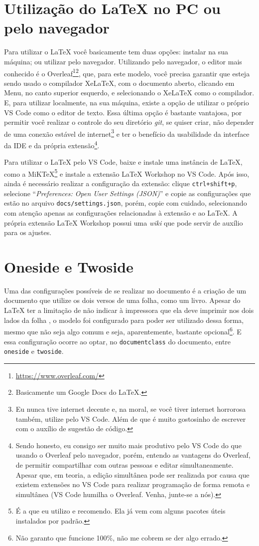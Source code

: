 \section{Utilização do \LaTeX{} no PC ou pelo navegador}
Para utilizar o \LaTeX{} você basicamente tem duas opções: instalar na sua máquina; ou utilizar pelo navegador. Utilizando pelo navegador, o editor mais conhecido é o Overleaf\footnote{\url{https://www.overleaf.com/}}\footnote{Basicamente um Google Docs do \LaTeX.}, que, para este modelo, você precisa garantir que esteja sendo usado o compilador XeLaTeX, com o documento aberto, clicando em Menu, no canto superior esquerdo, e selecionando o XeLaTeX como o compilador. E, para utilizar localmente, na sua máquina, existe a opção de utilizar o próprio VS Code como o editor de texto. Essa última opção é bastante vantajosa, por permitir você realizar o controle do seu diretório \textit{git}, se quiser criar, não depender de uma conexão estável de internet\footnote{Eu nunca tive internet decente e, na moral, se você tiver internet horrorosa também, utilize pelo VS Code. Além de que é muito gostosinho de escrever com o auxílio de sugestão de código.} e ter o benefício da usabilidade da interface da IDE e da própria extensão\footnote{Sendo honesto, eu consigo ser muito mais produtivo pelo VS Code do que usando o Overleaf pelo navegador, porém, entendo as vantagens do Overleaf, de permitir compartilhar com outras pessoas e editar simultaneamente. Apesar que, em teoria, a edição simultânea pode ser realizada por causa que existem extensões no VS Code para realizar programação de forma remota e simultânea (VS Code humilha o Overleaf. Venha, junte-se a nós).}.

Para utilizar o \LaTeX{} pelo VS Code, baixe e instale uma instância de \LaTeX, como a MiKTeX\footnote{É a que eu utilizo e recomendo. Ela já vem com alguns pacotes úteis instalados por padrão.} e instale a extensão LaTeX Workshop no VS Code. Após isso, ainda é necessário realizar a configuração da extensão: clique \texttt{ctrl+shift+p}, selecione ``\textit{Preferences: Open User Settings (JSON)}'' e copie as configurações que estão no arquivo \texttt{docs/settings.json}, porém, copie com cuidado, selecionando com atenção apenas as configurações relacionadas à extensão e ao \LaTeX. A própria extensão LaTeX Workshop possui uma \textit{wiki} que pode servir de auxílio para os ajustes.

\section{Oneside e Twoside}
Uma das configurações possíveis de se realizar no documento é a criação de um documento que utilize os dois versos de uma folha, como um livro. Apesar do \LaTeX{} ter a limitação de não indicar à impressora que ela deve imprimir nos dois lados da folha \cite{site:latex-impressora}, o modelo foi configurado para poder ser utilizado dessa forma, mesmo que não seja algo comum e seja, aparentemente, bastante opcional\footnote{Não garanto que funcione 100\%, não me cobrem se der algo errado.}. E essa configuração ocorre ao optar, no \texttt{documentclass} do documento, entre \texttt{oneside} e \texttt{twoside}.

